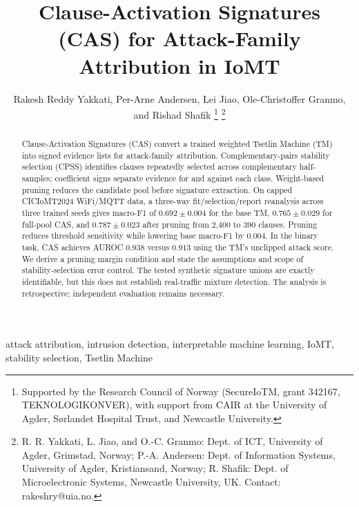 \documentclass[conference]{IEEEtran}
\begin{document}
\title{Clause-Activation Signatures (CAS) for Attack-Family Attribution in IoMT}

\author{Rakesh Reddy Yakkati, Per-Arne Andersen, Lei Jiao, Ole-Christoffer Granmo, and Rishad Shafik
\thanks{Supported by the Research Council of Norway (SecureIoTM, grant 342167, TEKNOLOGIKONVER), with support from CAIR at the University of Agder, S\o rlandet Hospital Trust, and Newcastle University.}%
\thanks{R. R. Yakkati, L. Jiao, and O.-C. Granmo: Dept. of ICT, University of Agder, Grimstad, Norway; P.-A. Andersen: Dept. of Information Systems, University of Agder, Kristiansand, Norway; R. Shafik: Dept. of Microelectronic Systems, Newcastle University, UK. Contact: rakeshry@uia.no.}}

\maketitle

\begin{abstract}
Clause-Activation Signatures (CAS) convert a trained weighted Tsetlin
Machine (TM) into signed evidence lists for attack-family attribution.
Complementary-pairs stability selection (CPSS) identifies clauses
repeatedly selected across complementary half-samples; coefficient
signs separate evidence for and against each class. Weight-based pruning reduces the candidate pool before
signature extraction. On capped CICIoMT2024 WiFi/MQTT data, a three-way
fit/selection/report reanalysis across three trained seeds gives macro-F1
of $0.692\pm0.004$ for the base TM, $0.765\pm0.029$ for full-pool CAS,
and $0.787\pm0.023$ after pruning from 2,400 to 390 clauses. Pruning
reduces threshold sensitivity while lowering base macro-F1 by 0.004.
In the binary task, CAS achieves AUROC 0.938 versus 0.913 using
the TM's unclipped attack score. We derive a pruning margin condition and state
the assumptions and scope of stability-selection error control.
The tested synthetic signature unions are exactly identifiable, but
this does not establish real-traffic mixture detection. The analysis is retrospective;
independent evaluation remains necessary.
\end{abstract}

\begin{IEEEkeywords}
attack attribution, intrusion detection, interpretable machine learning,
IoMT, stability selection, Tsetlin Machine
\end{IEEEkeywords}
\end{document}
